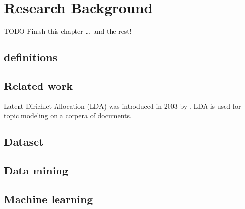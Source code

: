 \chapter{Research Background}  \label{ch:theory}

TODO Finish this chapter \ldots\ and the rest!


\section{definitions}

\section{Related work}  
Latent Dirichlet Allocation (LDA) was introduced in 2003 by \cite{Blei2003LatentAllocation}. LDA is used for topic modeling on a corpera of documents. 

\section{Dataset}

\section{Data mining}


\section{Machine learning}